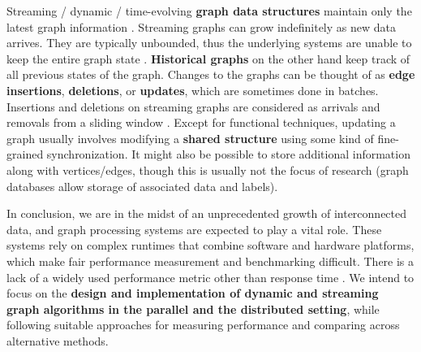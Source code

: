 % 


Streaming / dynamic / time-evolving \textbf{graph data structures} maintain only the latest graph information \cite{graph-besta19}. Streaming graphs can grow indefinitely as new data arrives. They are typically unbounded, thus the underlying systems are unable to keep the entire graph state \cite{graph-sakr21}. \textbf{Historical graphs} on the other hand keep track of all previous states of the graph. Changes to the graphs can be thought of as \textbf{edge insertions}, \textbf{deletions}, or \textbf{updates}, which are sometimes done in batches. Insertions and deletions on streaming graphs are considered as arrivals and removals from a sliding window \cite{graph-sakr21}. Except for functional techniques, updating a graph usually involves modifying a \textbf{shared structure} using some kind of fine-grained synchronization. It might also be possible to store additional information along with vertices/edges, though this is usually not the focus of research (graph databases allow storage of associated data and labels).

In conclusion, we are in the midst of an unprecedented growth of interconnected data, and graph processing systems are expected to play a vital role. These systems rely on complex runtimes that combine software and hardware platforms, which make fair performance measurement and benchmarking difficult. There is a lack of a widely used performance metric other than response time \cite{graph-sakr21}. We intend to focus on the \textbf{design and implementation of dynamic and streaming graph algorithms in the parallel and the distributed setting}, while following suitable approaches for measuring performance and comparing across alternative methods.




% 

